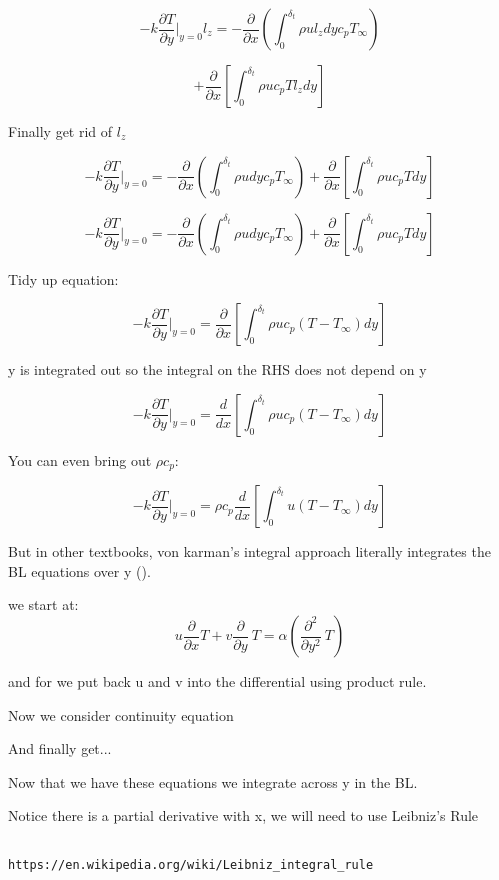 \documentclass[11pt]{article}
\begin{document}
$$- k \frac{\partial T}{\partial y} |_{y=0} l_z   = - \frac{\partial}{\partial x} (\int_0^{\delta_t} \rho u l_z dy  c_p T_\infty ) $$

$$+ \frac{\partial}{\partial x} [ \int_0^{\delta_t} \rho u c_p T l_z dy ]$$

Finally get rid of $l_z$

$$- k \frac{\partial T}{\partial y} |_{y=0}    = - \frac{\partial}{\partial x} (\int_0^{\delta_t} \rho u  dy  c_p T_\infty ) + \frac{\partial}{\partial x} [ \int_0^{\delta_t} \rho u c_p T  dy ]$$

$$- k \frac{\partial T}{\partial y} |_{y=0}    = - \frac{\partial}{\partial x} (\int_0^{\delta_t} \rho u  dy  c_p T_\infty ) + \frac{\partial}{\partial x} [ \int_0^{\delta_t} \rho u c_p T  dy ]$$


Tidy up equation:

$$- k \frac{\partial T}{\partial y} |_{y=0}    = \frac{\partial}{\partial x} [ \int_0^{\delta_t} \rho u c_p ( T -  T_\infty)  dy ]$$

y is integrated out so the integral on the RHS does not depend on y

$$- k \frac{\partial T}{\partial y} |_{y=0}    = \frac{d}{d x} [ \int_0^{\delta_t} \rho u c_p ( T -  T_\infty)  dy ]$$

You can even bring out $\rho c_p$:

$$- k \frac{\partial T}{\partial y} |_{y=0}    = \rho c_p \frac{d}{d x} [ \int_0^{\delta_t}  u  ( T -  T_\infty)  dy ]$$

But in other textbooks, von karman's integral approach literally integrates the BL equations over y (\cite{bejan2013convection}). 


we start at:
$$ u \frac{\partial}{\partial x} T + v \frac{\partial }{\partial y} \ T  = \alpha (\frac{\partial^2 }{\partial y^2} \ T ) $$ 

and for we put back u and v into the differential using product rule. 

Now we consider continuity equation

And finally get...


Now that we have these equations we integrate across y in the BL.


Notice there is a partial derivative with x, we will need to use Leibniz's Rule

\begin{verbatim}

https://en.wikipedia.org/wiki/Leibniz_integral_rule
\end{verbatim}
\end{document}
